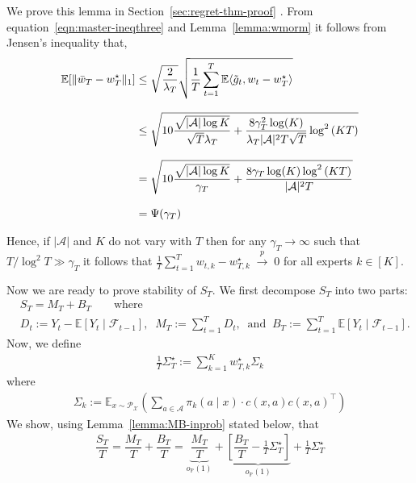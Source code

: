 \documentclass[11pt,letterpaper]{article}
\newcommand{\Prob}{\mathbb{P}}
\newcommand{\Exs}{\mathbb{E}}
\newcommand{\wstar}{w^\star}
\newcommand{\numactions}{|\mathcal{A}|}
\newcommand{\inprob}{\; \stackrel{p}{\rightarrow} \; }
\newcommand{\BT}{{\Sigma^\star_T}}
\newcommand{\err}{\Psi(\gamma_T)}
\theoremstyle{plain}
\theoremstyle{definition}  %
\begin{document}
\noindent We  prove this lemma in Section~\ref{sec:regret-thm-proof}
. From equation~\eqref{eqn:master-ineqthree} and Lemma~\ref{lemma:wmorm} it follows from Jensen's inequality that,
\begin{align}\label{eqn:wlone-err}
\notag
    \Exs[\|\bar{w}_{T} - \wstar_T \|_1] 
    &\leq \sqrt{\frac{2}{\lambda_T}} \sqrt{\dfrac{1}{T} \sum_{t=1}^T \Exs\langle \tilde{g}_t , w_{t} - \wstar_T \rangle } \notag \\[8pt] \notag
    & \leq  \sqrt{10{\frac{\sqrt{\numactions \log K}}{\sqrt{T}\lambda_T}} +
     \frac{8\gamma_T^2 \log(K) }{ \lambda_T \numactions^2 T \sqrt{T}}  \log^2\left( KT \right)}\\[8pt] \notag
    & =  \sqrt{10{\frac{\sqrt{\numactions \log K}}{\gamma_T}} +
     \frac{8\gamma_T \log(K) \log^2\left( KT \right) }{ \numactions^2 T  }  }\\[8pt]
    & = \err
\end{align}

\noindent  Hence, if $\numactions$ and $K$ do not vary with $T$ then for any $\gamma_T \rightarrow \infty$ such that $ T/ \log^2 T \gg \gamma_T$ it follows that $\frac{1}{T}\sum_{t = 1}^T w_{t,k}-\wstar_{T,k}  \inprob 0$ for all experts $k \in [K]$. 

\noindent Now we are ready to prove stability of $S_T$. We first decompose $S_T$ into two parts:
\begin{subequations}
\begin{align}\label{defn:MT-BT}
    &S_T = M_T + B_T \qquad \text{where}  \\
&D_t := Y_t - \mathbb{E}[Y_t\mid \mathcal{F}_{t-1}], \;\;   M_T := \sum_{t=1}^T D_t, \;\; \text{and} \;\;  B_T := \sum_{t=1}^T \mathbb{E}[Y_t\mid \mathcal{F}_{t-1}].  
\end{align}
\end{subequations} 
\noindent Now, we define
\begin{align}\label{defn:Sigma-star}
    \frac{1}{T} \BT := \sum^K_{k = 1} \wstar_{T,k} \Sigma_k
\end{align}
where 
\begin{align*}
    \Sigma_k :=   \mathbb{E}_{x \sim \mathcal{P_X}} \left( \sum_{a \in \mathcal{A}} \pi_k(a \mid x) \cdot c(x, a) c(x, a)^\top \right)
\end{align*}
%
\noindent We show, using Lemma~\ref{lemma:MB-inprob} stated below, that
\begin{align}
\label{eqn:ST-decomp-II}
    \dfrac{S_T}{T} 
    = \dfrac{M_T}{T} + \dfrac{B_T}{T} 
     = \underbrace{\dfrac{M_T}{T}}_{o_{\Prob}(1)} + \underbrace{\left[\dfrac{B_T}{T}-\frac{1}{T} \BT \right]}_{o_{\Prob}(1)} + \frac{1}{T} \BT  
\end{align}
\end{document}
